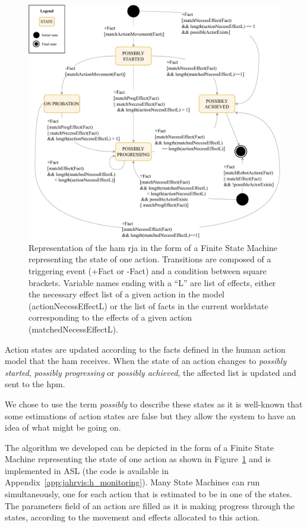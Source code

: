 \documentclass[a4paper,11pt,twoside]{StyleThese}
\begin{document}
\begin{figure}[!hbt]
	\includegraphics[width=\linewidth]{figures/chapter2/action_sm.pdf}
	\caption{Representation of the \acrfull{ham} \acrshort{rja} in the form of a Finite State Machine representing the state of one action. Transitions are composed of a triggering event (+Fact or -Fact) and a condition between square brackets. Variable names ending with a ``L'' are list of effects, either the necessary effect list of a given action in the model (actionNecessEffectL) or the list of facts in the current worldstate corresponding to the effects of a given action (matchedNecessEffectL).}
	\label{chap6:fig:action_monitoring}
\end{figure}

Action states are updated according to the facts defined in the human action model that the \acrshort{ham} receives. When the state of an action changes to \emph{possibly started}, \emph{possibly progressing} or \emph{possibly achieved}, the affected list is updated and sent to the \acrshort{hpm}. 

We chose to use the term \emph{possibly} to describe these states as it is well-known that some estimations of action states are false but they allow the system to have an idea of what might be going on.

The algorithm we developed can be depicted in the form of a Finite State Machine representing the state of one action as shown in Figure~\ref{chap6:fig:action_monitoring} and is implemented in ASL (the code is available in Appendix~\ref{app:jahrvis:h_monitoring}). Many State Machines can run simultaneously, one for each action that is estimated to be in one of the states. The parameters field of an action are filled as it is making progress through the states, according to the movement and effects allocated to this action.
\end{document}
